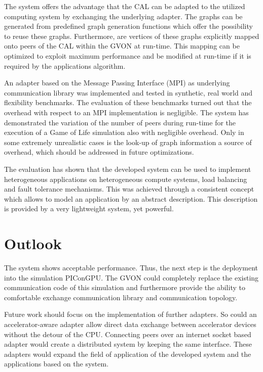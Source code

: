 The system offers the advantage that the CAL can be adapted to the
utilized computing system by exchanging the underlying adapter.  The
graphs can be generated from predefined graph generation functions
which offer the possibility to reuse these graphs. Furthermore, are
vertices of these graphs explicitly mapped onto peers of the CAL
within the GVON at run-time. This mapping can be optimized to exploit
maximum performance and be modified at run-time if it is required by
the applications algorithm.

An adapter based on the Message Passing Interface (MPI) as underlying
communication library was implemented and tested in synthetic, real
world and flexibility benchmarks. The evaluation of these benchmarks
turned out that the overhead with respect to an MPI implementation is
negligible.  The system has demonstrated the variation of the number
of peers during run-time for the execution of a Game of Life
simulation also with negligible overhead. Only in some extremely unrealistic
cases is the look-up of graph information a source of overhead, which
should be addressed in future optimizations.

The evaluation has shown that the developed system can be used to
implement heterogeneous applications on heterogeneous compute systems,
load balancing and fault tolerance mechanisms. This was achieved
through a consistent concept which allows to model an application by
an abstract description. This description is provided by a very
lightweight system, yet powerful.


\chapter{Outlook}
\label{sec:outlook}


The system shows acceptable performance. Thus, the next step is the
deployment into the simulation PIConGPU. The GVON could completely
replace the existing communication code of this simulation and
furthermore provide the ability to comfortable exchange communication
library and communication topology.

Future work should focus on the implementation of further adapters. So
could an accelerator-aware adapter allow direct data exchange between
accelerator devices without the detour of the CPU. Connecting peers
over an internet socket based adapter would create a distributed
system by keeping the same interface.  These adapters would expand the
field of application of the developed system and the applications
based on the system.  

